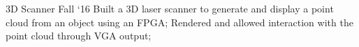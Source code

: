 \project
    {3D Scanner}
    {Fall `16}
    {
        Built a 3D laser scanner to generate and display a point cloud from an object using an FPGA;
        Rendered and allowed interaction with the point cloud through VGA output;
    }
